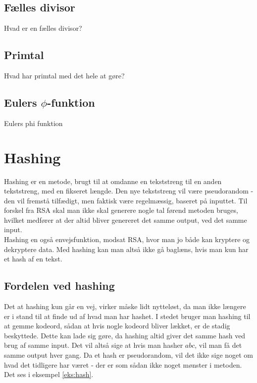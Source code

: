 \documentclass[a4paper, 12pt]{article}
\theoremstyle{break}
\newtheorem{eks}[definition]{Eksempel}
\theoremstyle{breakline}
\newtheorem{sentence}[definition]{Sætning}
\newenvironment{sent}
    {\begin{sentence}\mbox{}\begin{adjustwidth}{1em}{1em}}
    {\end{adjustwidth}\par\noindent\hrulefill\end{sentence}}
\theoremstyle{beviser}
\newtheorem*{bevis}{Bevis:} %
\begin{document}
    \subsection{Fælles divisor}
    Hvad er en fælles divisor?






    \subsection{Primtal}
    Hvad har primtal med det hele at gøre?

    \subsection{Eulers \texorpdfstring{\(\phi\)}{Lg}-funktion}
    Eulers phi funktion


\newpage
\section{Hashing}
Hashing er en metode, brugt til at omdanne en tekststreng til en anden tekststreng, med en fikseret længde.
Den nye tekststreng vil være pseudorandom - den vil fremstå tilfædigt, men faktisk være regelmæssig, baseret på inputtet.
Til forskel fra RSA skal man ikke skal generere nogle tal førend metoden bruges, hvilket medfører at der altid bliver genereret det samme output, ved det samme input.
\\
Hashing en også envejsfunktion, modsat RSA, hvor man jo både kan kryptere og dekryptere data.
Med hashing kan man altså ikke gå baglæns, hvis man kun har et hash af en tekst.


    \subsection{Fordelen ved hashing}
    Det at hashing kun går en vej, virker måske lidt nytteløst, da man ikke længere er i stand til at finde ud af hvad man har hashet.
    I stedet bruger man hashing til at gemme kodeord, sådan at hvis nogle kodeord bliver lækket, er de stadig beskyttede.
    Dette kan lade sig gøre, da hashing altid giver det samme hash ved brug af samme input.
    Det vil altså sige at hvis man hasher \(abc\), vil man få det samme output hver gang.
    Da et hash er pseudorandom, vil det ikke sige noget om hvad det tidligere har været - der er som sådan ikke noget mønster i metoden.
    Det ses i eksempel \autoref{eks:hash}.
\end{document}
